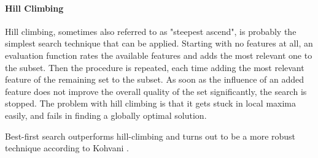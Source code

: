 \paragraph{Hill Climbing}
\label{par:methods.flat.wrapper.hill_climbing}


Hill climbing, sometimes also referred to as "steepest ascend", is probably the simplest search technique that can be applied. Starting with no features at all, an evaluation function rates the available features and adds the most relevant one to the subset. Then the procedure is repeated, each time adding the most relevant feature of the remaining set to the subset. As soon as the influence of an added feature does not improve the overall quality of the set significantly, the search is stopped. The problem with hill climbing is that it gets stuck in local maxima easily, and fails in finding a globally optimal solution. \cite{Kohavi:97}

Best-first search outperforms hill-climbing and turns out to be a more robust technique according to Kohvani \cite{Kohavi:97}.